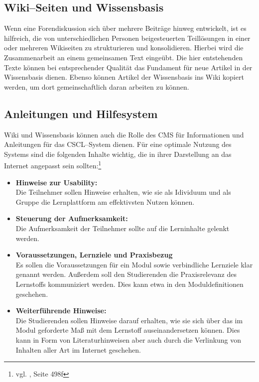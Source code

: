 \subsection{Wiki--Seiten und Wissensbasis} %
\label{sub:wiki_seiten_zur_zusammenarbeit}
Wenn eine Forendiskussion sich über mehrere Beiträge hinweg entwickelt, ist es hilfreich, die von unterschiedlichen Personen beigesteuerten Teillösungen in einer oder mehreren Wikiseiten zu strukturieren und konsolidieren. Hierbei wird die Zusammenarbeit an einem gemeinsamen Text eingeübt. Die hier entstehenden Texte können bei entsprechender Qualität das Fundament für neue Artikel in der Wissensbasis dienen. Ebenso können Artikel der Wissensbasis ins Wiki kopiert werden, um dort gemeinschaftlich daran arbeiten zu können.

\subsection{Anleitungen und Hilfesystem} %
\label{sub:anleitungen_und_hilfesystem}
Wiki und Wissensbasis können auch die Rolle des \ac{CMS} für Informationen und Anleitungen für das \ac{CSCL}–System dienen. Für eine optimale Nutzung des Systems sind die folgenden Inhalte wichtig, die in ihrer Darstellung an das Internet angepasst sein sollten:\footnote{vgl. \cite{euler}, Seite 498f}

\begin{itemize}
	\item \textbf{Hinweise zur Usability:}\\ Die Teilnehmer sollen Hinweise erhalten, wie sie als Idividuum und als Gruppe die Lernplattform am effektivsten Nutzen können.
	\item \textbf{Steuerung der Aufmerksamkeit:}\\ Die Aufmerksamkeit der Teilnehmer sollte auf die Lerninhalte gelenkt werden.
	\item \textbf{Voraussetzungen, Lernziele und Praxisbezug}\\ Es sollen die Voraussetzungen für ein Modul sowie verbindliche Lernziele klar genannt werden. Außerdem soll den Studierenden die Praxisrelevanz des Lernstoffs kommuniziert werden. Dies kann etwa in den Moduldefinitionen geschehen.
	\item \textbf{Weiterführende Hinweise:}\\ Die Studierenden sollen Hinweise darauf erhalten, wie sie sich über das im Modul geforderte Maß mit dem Lernstoff auseinandersetzen können. Dies kann in Form von Literaturhinweisen aber auch durch die Verlinkung von Inhalten aller Art im Internet geschehen.
\end{itemize}

